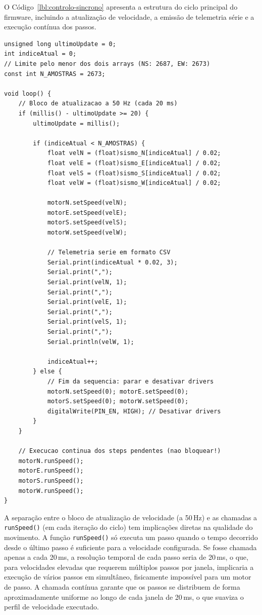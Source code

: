 O Código~\ref{lbl:controlo-sincrono} apresenta a estrutura do ciclo principal do firmware, incluindo a atualização de velocidade, a emissão de telemetria série e a execução contínua dos passos.

\begin{listing}[h]
\begin{verbatim}
unsigned long ultimoUpdate = 0;
int indiceAtual = 0;
// Limite pelo menor dos dois arrays (NS: 2687, EW: 2673)
const int N_AMOSTRAS = 2673;

void loop() {
    // Bloco de atualizacao a 50 Hz (cada 20 ms)
    if (millis() - ultimoUpdate >= 20) {
        ultimoUpdate = millis();

        if (indiceAtual < N_AMOSTRAS) {
            float velN = (float)sismo_N[indiceAtual] / 0.02;
            float velE = (float)sismo_E[indiceAtual] / 0.02;
            float velS = (float)sismo_S[indiceAtual] / 0.02;
            float velW = (float)sismo_W[indiceAtual] / 0.02;

            motorN.setSpeed(velN);
            motorE.setSpeed(velE);
            motorS.setSpeed(velS);
            motorW.setSpeed(velW);

            // Telemetria serie em formato CSV
            Serial.print(indiceAtual * 0.02, 3);
            Serial.print(",");
            Serial.print(velN, 1);
            Serial.print(",");
            Serial.print(velE, 1);
            Serial.print(",");
            Serial.print(velS, 1);
            Serial.print(",");
            Serial.println(velW, 1);

            indiceAtual++;
        } else {
            // Fim da sequencia: parar e desativar drivers
            motorN.setSpeed(0); motorE.setSpeed(0);
            motorS.setSpeed(0); motorW.setSpeed(0);
            digitalWrite(PIN_EN, HIGH); // Desativar drivers
        }
    }

    // Execucao continua dos steps pendentes (nao bloquear!)
    motorN.runSpeed();
    motorE.runSpeed();
    motorS.runSpeed();
    motorW.runSpeed();
}
\end{verbatim}
\caption{Ciclo principal do firmware: controlo síncrono dos quatro motores a 50\,Hz.}
\label{lbl:controlo-sincrono}
\end{listing}

A separação entre o bloco de atualização de velocidade (a 50\,Hz) e as chamadas a \texttt{runSpeed()} (em cada iteração do ciclo) tem implicações diretas na qualidade do movimento. A função \texttt{runSpeed()} só executa um passo quando o tempo decorrido desde o último passo é suficiente para a velocidade configurada. Se fosse chamada apenas a cada 20\,ms, a resolução temporal de cada passo seria de 20\,ms, o que, para velocidades elevadas que requerem múltiplos passos por janela, implicaria a execução de vários passos em simultâneo, fisicamente impossível para um motor de passo. A chamada contínua garante que os passos se distribuem de forma aproximadamente uniforme ao longo de cada janela de 20\,ms, o que suaviza o perfil de velocidade executado.


